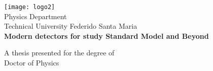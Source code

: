\begin{titlepage}
	\begin{center}
		\vspace*{1cm}

		\texttt{[image: logo2]}\\
		\Large
		Physics Department \\
		Technical University Federido Santa Maria \\
		\vspace{4.5cm}
		\Huge
		\textbf{Modern detectors for study Standard Model and Beyond}
		

		\vspace{1.5cm}

		\vfill

		A thesis presented for the degree of\\
		Doctor of Physics



		\end{center}
\end{titlepage}


